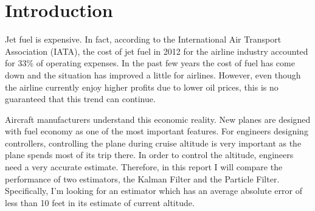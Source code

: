 \section{Introduction} \label{sec:intro}


Jet fuel is expensive. In fact, according to the International Air
Transport Association (IATA), the cost of jet fuel in 2012 for the
airline industry accounted for 33\% of operating expenses. In the past
few years the cost of fuel has come down and the situation has improved
a little for airlines. However, even though the airline currently
enjoy higher profits due to lower oil prices, this is no guaranteed
that this trend can continue. 

Aircraft manufacturers understand this economic reality. New planes
are designed with fuel economy as one of the most important
features. For engineers designing controllers, controlling the plane
during cruise altitude is very important as the plane spends most of
its trip there. In order to control the altitude, engineers need a very
accurate estimate. Therefore, in this report I will compare the
performance of two estimators, the Kalman Filter and the Particle
Filter. Specifically, I'm looking for an estimator which has an
average absolute error of less than 10 feet in its estimate of current
altitude.
